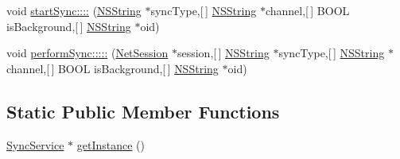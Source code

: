 \begin{DoxyCompactItemize}
\item 
void \hyperlink{interface_sync_service_a40d8e1ec9d776105bbcd2287c04ef381}{start\-Sync\-::::} (\hyperlink{class_n_s_string}{\-N\-S\-String} $\ast$sync\-Type,\mbox{[}$\,$\mbox{]} \hyperlink{class_n_s_string}{\-N\-S\-String} $\ast$channel,\mbox{[}$\,$\mbox{]} \-B\-O\-O\-L is\-Background,\mbox{[}$\,$\mbox{]} \hyperlink{class_n_s_string}{\-N\-S\-String} $\ast$oid)
\item 
void \hyperlink{interface_sync_service_ae984191c3468f7007e27258a4146b488}{perform\-Sync\-:::::} (\hyperlink{interface_net_session}{\-Net\-Session} $\ast$session,\mbox{[}$\,$\mbox{]} \hyperlink{class_n_s_string}{\-N\-S\-String} $\ast$sync\-Type,\mbox{[}$\,$\mbox{]} \hyperlink{class_n_s_string}{\-N\-S\-String} $\ast$channel,\mbox{[}$\,$\mbox{]} \-B\-O\-O\-L is\-Background,\mbox{[}$\,$\mbox{]} \hyperlink{class_n_s_string}{\-N\-S\-String} $\ast$oid)
\end{DoxyCompactItemize}
\subsection*{\-Static \-Public \-Member \-Functions}
\begin{DoxyCompactItemize}
\item 
\hyperlink{interface_sync_service}{\-Sync\-Service} $\ast$ \hyperlink{interface_sync_service_a7bad0b15f1fe729e341e332046f6ff3d}{get\-Instance} ()
\end{DoxyCompactItemize}


